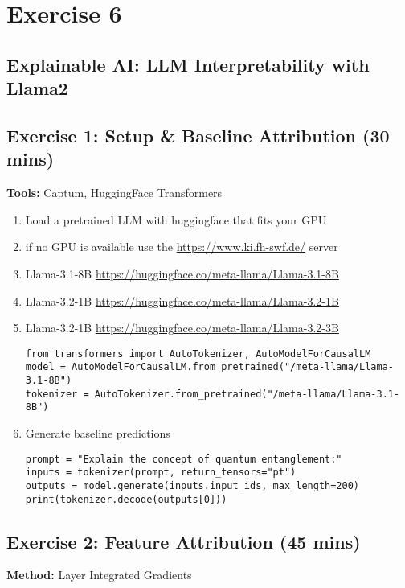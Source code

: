 \chapter*{Exercise 6}
\section*{Explainable AI: LLM Interpretability with Llama2}

\section*{Exercise 1: Setup \& Baseline Attribution (30 mins)}
\textbf{Tools:} Captum, HuggingFace Transformers

\begin{enumerate}
\item Load a pretrained LLM with huggingface that fits your GPU
\item if no GPU is available use the \url{https://www.ki.fh-swf.de/} server
\item Llama-3.1-8B \url{https://huggingface.co/meta-llama/Llama-3.1-8B}
\item Llama-3.2-1B \url{https://huggingface.co/meta-llama/Llama-3.2-1B}
\item Llama-3.2-1B \url{https://huggingface.co/meta-llama/Llama-3.2-3B}
\begin{verbatim}
from transformers import AutoTokenizer, AutoModelForCausalLM
model = AutoModelForCausalLM.from_pretrained("/meta-llama/Llama-3.1-8B")
tokenizer = AutoTokenizer.from_pretrained("/meta-llama/Llama-3.1-8B")
\end{verbatim}

\item Generate baseline predictions
\begin{verbatim}
prompt = "Explain the concept of quantum entanglement:"
inputs = tokenizer(prompt, return_tensors="pt")
outputs = model.generate(inputs.input_ids, max_length=200)
print(tokenizer.decode(outputs[0]))
\end{verbatim}
\end{enumerate}

\section*{Exercise 2: Feature Attribution (45 mins)}
\textbf{Method:} Layer Integrated Gradients

